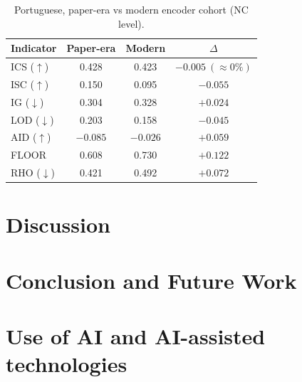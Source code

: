 \documentclass[twoside]{romjist}
\begin{document}
\begin{table}[t]
\centering
\caption{Portuguese, paper-era vs modern encoder cohort (NC level).}
\begin{tabular}{lccc}
\toprule
Indicator & Paper-era & Modern & $\Delta$ \\
\midrule
ICS ($\uparrow$) & 0.428 & 0.423 & $-0.005\ (\approx 0\%)$ \\
ISC ($\uparrow$) & 0.150 & 0.095 & $-0.055$ \\
IG ($\downarrow$) & 0.304 & 0.328 & $+0.024$ \\
LOD ($\downarrow$) & 0.203 & 0.158 & $-0.045$ \\
AID ($\uparrow$) & $-0.085$ & $-0.026$ & $+0.059$ \\
FLOOR & 0.608 & 0.730 & $+0.122$ \\
RHO ($\downarrow$) & 0.421 & 0.492 & $+0.072$ \\
\bottomrule
\end{tabular}
\end{table}


\section{Discussion}

\section{Conclusion and Future Work}

\section*{Use of AI and AI-assisted technologies}



\end{document}
